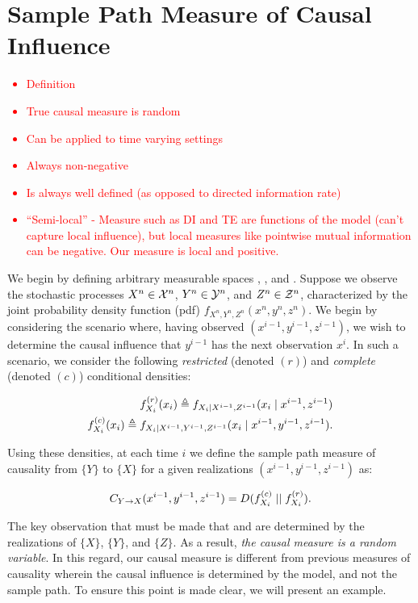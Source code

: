 \section{Sample Path Measure of Causal Influence}

\textcolor{red}
{\begin{itemize}
    \item Definition
    \item True causal measure is random
    \item Can be applied to time varying settings
    \item Always non-negative
    \item Is always well defined (as opposed to directed information rate)
    \item ``Semi-local'' - Measure such as DI and TE are functions of the model (can't capture local influence), but local measures like pointwise mutual information can be negative. Our measure is local and positive.
\end{itemize}}

We begin by defining arbitrary measurable spaces , , and . Suppose we observe the stochastic processes $X^n \in \mathcal{X}^n$, $Y^n \in \mathcal{Y}^n$, and $Z^n \in \mathcal{Z}^n$, characterized by the joint probability density function (pdf) $f_{X^n,Y^n,Z^n}(x^n,y^n,z^n)$. We begin by considering the scenario where, having observed $(x^{i-1},y^{i-1},z^{i-1})$, we wish to determine the causal influence that $y^{i-1}$ has the next observation $x^i$. In such a scenario, we consider the following \emph{restricted} (denoted $(r)$) and \emph{complete} (denoted $(c)$) conditional densities:

\begin{eqnarray}
f_{X_i}^{(r)}(x_i) \triangleq f_{X_i \mid X^{i-1},Z^{i-1}}
    (x_i \mid x^{i-1},z^{i-1}) \\
f_{X_i}^{(c)}(x_i) \triangleq f_{X_i \mid X^{i-1},Y^{i-1},Z^{i-1}}
    (x_i \mid x^{i-1},y^{i-1},z^{i-1}).
\end{eqnarray}

\noindent Using these densities, at each time $i$ we define the sample path measure of causality from $\{Y\}$ to $\{X\}$ for a given realizations $(x^{i-1},y^{i-1},z^{i-1})$ as:

\begin{equation}
C_{Y\rightarrow X}(x^{i-1},y^{i-1},z^{i-1}) = D(f_{X_i}^{(c)} \mid \mid f_{X_i}^{(r)}).
\end{equation}

The key observation that must be made that  and  are determined by the realizations of $\{X\}$, $\{Y\}$, and $\{Z\}$. As a result, \emph{the causal measure is a random variable}. In this regard, our causal measure is different from previous measures of causality wherein the causal influence is determined by the model, and not the sample path. To ensure this point is made clear, we will present an example.

